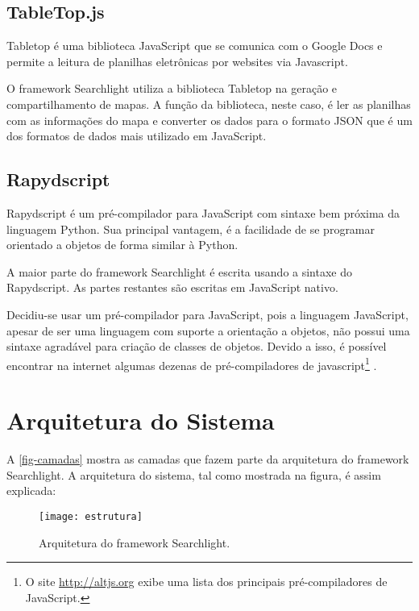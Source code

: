 \subsection{TableTop.js}

Tabletop\cite{tabletop} é uma biblioteca JavaScript que se comunica com o Google Docs e permite a leitura de planilhas eletrônicas por websites via Javascript. 

O framework Searchlight utiliza a biblioteca Tabletop na geração e compartilhamento de mapas. A função da biblioteca, neste caso, é ler as planilhas com as informações do mapa e converter os dados para o formato JSON que é um dos formatos de dados mais utilizado em JavaScript.


\subsection{Rapydscript}

Rapydscript \cite{rapydscript} é um pré-compilador para JavaScript com sintaxe bem próxima da linguagem Python. Sua principal vantagem, é a facilidade de se programar orientado a objetos de forma similar à Python. 

A maior parte do framework Searchlight é escrita usando a sintaxe do Rapydscript. As partes restantes são escritas em JavaScript nativo.

Decidiu-se usar um pré-compilador para JavaScript,  pois a linguagem JavaScript, apesar de ser uma linguagem com suporte a orientação a objetos, não possui uma sintaxe agradável para criação de classes de objetos. Devido a isso, é possível encontrar na internet algumas dezenas de pré-compiladores de javascript\footnote{O site \url{http://altjs.org} exibe uma lista dos principais pré-compiladores de JavaScript.}
. 


\section{Arquitetura do Sistema}
A \autoref{fig-camadas} mostra as camadas que fazem parte da arquitetura do framework Searchlight. A arquitetura do sistema, tal como mostrada na figura, é assim explicada:
	\begin{figure}[htb]
	\caption{\label{fig-camadas}Arquitetura do framework Searchlight.}
	\begin{center}
	    \texttt{[image: estrutura]}
	\end{center}
\end{figure}

